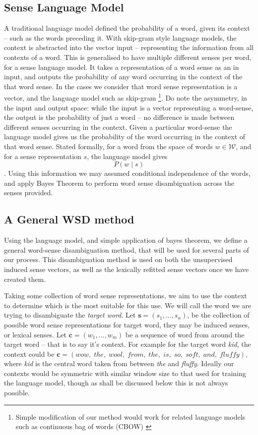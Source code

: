 \documentclass{sig-alternate}
\newcommand{\W}{\mathcal{W}}
\renewcommand{\c}{\mathbf{c}}
\newcommand{\s}{\mathbf{s}}
\begin{document}
\subsection{Sense Language Model} \label{senselanguagemodel}
A traditional language model defined the probability of a word, given its context -- such as the words preceding it.
With skip-gram style language models, the context is abstracted into the vector input -- representing the information from all contexts of a word. This is generalised to have multiple different senses per word, for a sense language model.
It takes a representation of a word sense as an in input, and outputs the probability of any word occurring in the context of the that word sense. In the cases we consider that word sense representation is a vector, and the language model such as skip-gram\parencite{mikolov2013efficient} \footnote{Simple modification of our method would work for related language models such as continuous bag of words (CBOW) \parencite{mikolov2013efficient}}. Do note the asymmetry, in the input and output space: while the input is a vector representing a word-sense, the output is the probability of just a word -- no difference is made between different senses occurring in the context. Given a particular word-sense the language model gives us the probability of the word occurring in the context of that word sense. Stated formally, for a word from the space of words $w\in \W$, and for a sense representation $s$, the language model gives $$P(w \mid s)$$. Using this information we may assumed conditional independence of the words, and apply Bayes Theorem to perform word sense disambiguation across the senses provided.

\subsection{A General WSD method} \label{generalwsd}
Using the language model, and simple application of bayes theorem, we define a general word-sense disambiguation method, that will be used for several parts of our process. This disambiguation method is used on both the unsupervised induced sense vectors, as well as the lexically refitted sense vectors once we have created them.

Taking some collection of word sense representations, we aim to use the context to determine which is the most suitable for this use.
We will call the word we are trying to disambiguate the \emph{target word}.
Let $\s=(s_{1},...,s_{n})$, be the collection of possible word sense representations for target word, they may be induced senses, or lexical senses.
Let $\c=(w_{1},...,w_{m})$ be a sequence of word from around the target word -- that is to say it's context.
For example for the target word \emph{kid}, the context could be \mbox{$\c=(wow,\; the,\; wool,\; from,\; the,\; is,\; so,\; soft,\; and,\; fluffy)$}, where \emph{kid} is the central word taken from between \emph{the} and \emph{fluffy}.
Ideally our contexts would be symmetric with similar window size to that used for training the language model, though as shall be discussed below this is not always possible.
 
\end{document}
